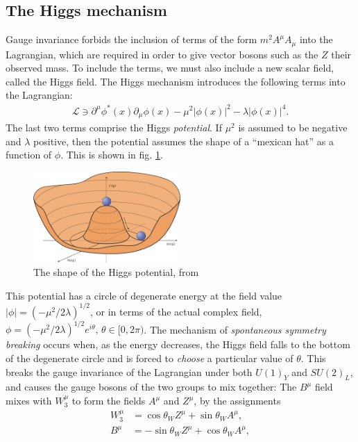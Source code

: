 \subsection{The Higgs mechanism}
Gauge invariance forbids the inclusion of terms of the form $m^2A^\mu A_\mu$ into the Lagrangian, which are required in order to give vector bosons such as the $Z$ their observed mass. To include the terms, we must also include a new scalar field, called the Higgs field. The Higgs mechanism introduces the following terms into the Lagrangian:
\begin{align}
	\mathcal L \ni \partial^\mu \phi^*(x) \partial_\mu \phi(x) - \mu^2|\phi(x)|^2 - \lambda |\phi(x)|^4.
\end{align}
The last two terms comprise the Higgs {\it potential}. If $\mu^2$ is assumed to be negative and $\lambda$ positive, then the potential assumes the shape of a ``mexican hat'' as a function of $\phi$. This is shown in fig. \ref{fig:higgspot}.
\begin{figure}[hbt]
	\centering
	\includegraphics[width=0.5\textwidth]{figures/susyintro/higgspot_nature.jpg}
	\caption{The shape of the Higgs potential, from \cite{Ellis:higgs}}
	\label{fig:higgspot}
\end{figure}
This potential has a circle of degenerate energy at the field value $|\phi| = (-\mu^2/2\lambda)^{1/2}$, or in terms of the actual complex field, $\phi = (-\mu^2/2\lambda)^{1/2}e^{i\theta}, \, \theta \in [0,2\pi)$. The mechanism of {\it spontaneous symmetry breaking} occurs when, as the energy decreases, the Higgs field falls to the bottom of the degenerate circle and is forced to {\it choose} a particular value of $\theta$. This breaks the gauge invariance of the Lagrangian under both $U(1)_Y$ and $SU(2)_L$, and causes the gauge bosons of the two groups to mix together: The $B^\mu$ field mixes with $W^\mu_3$ to form the fields $A^\mu$ and $Z^\mu$, by the assignments
\begin{align}
	W_3^\mu &= \cos\theta_W Z^\mu + \sin\theta_W A^\mu,\\
	B^\mu &= -\sin\theta_W Z^\mu + \cos\theta_W A^\mu,
\end{align}

